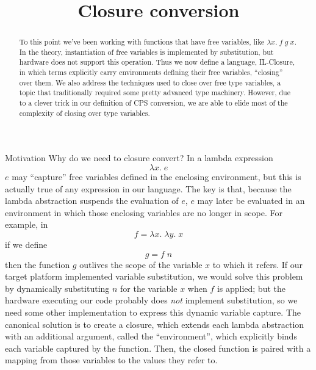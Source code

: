 \documentclass{amsart}
\title{Closure conversion}
\begin{document}
\maketitle

\begin{abstract}
    To this point we've been working with functions that have free variables, like $\lambda x. \; f \; g \; x$. In the theory, instantiation of free variables is implemented by substitution, but hardware does not support this operation. Thus we now define a language, IL-Closure, in which terms explicitly carry environments defining their free variables, ``closing'' over them. We also address the techniques used to close over free type variables, a topic that traditionally required some pretty advanced type machinery. However, due to a clever trick in our definition of CPS conversion, we are able to elide most of the complexity of closing over type variables.
\end{abstract}

\begin{section}{Motivation}
Why do we need to closure convert? In a lambda expression
  \[
    \lambda x. \; e
  \]
$e$ may ``capture'' free variables defined in the enclosing environment, but this is actually true of any expression in our language. The key is that, because the lambda abstraction suspends the evaluation of $e$, $e$ may later be evaluated in an environment in which those enclosing variables are no longer in scope. For example, in
  \[
    f = \lambda x. \; \lambda y. \; x
  \]
if we define 
  \[
    g = f \; n
  \]
then the function $g$ outlives the scope of the variable $x$ to which it refers. If our target platform implemented variable substitution, we would solve this problem by dynamically substituting $n$ for the variable $x$ when $f$ is applied; but the hardware executing our code probably does {\it not} implement substitution, so we need some other implementation to express this dynamic variable capture. The canonical solution is to create a closure, which extends each lambda abstraction with an additional argument, called the ``environment'', which explicitly binds each variable captured by the function. Then, the closed function is paired with a mapping from those variables to the values they refer to.
\end{section}
\end{document}
